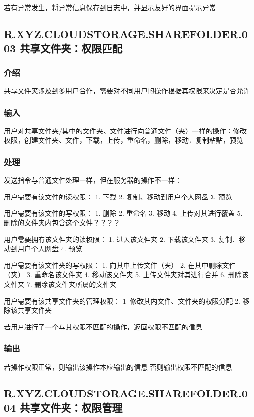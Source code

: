 若有异常发生，将异常信息保存到日志中，并显示友好的界面提示异常


\subsection{R.XYZ.CLOUDSTORAGE.SHAREFOLDER.003 共享文件夹：权限匹配}
 
\subsubsection{介绍}
共享文件夹涉及到多用户合作，需要对不同用户的操作根据其权限来决定是否允许

\subsubsection{输入} 
用户对共享文件夹/其中的文件夹、文件进行向普通文件（夹）一样的操作：修改权限，创建文件夹、文件，下载，上传，重命名，删除，移动，复制粘贴，预览

\subsubsection{处理} 
发送指令与普通文件处理一样，但在服务器的操作不一样：

用户需要有该文件的读权限：
1. 下载
2. 复制、移动到用户个人网盘
3. 预览

用户需要有该文件的写权限：
1. 删除
2. 重命名
3. 移动
4. 上传对其进行覆盖
5. 删除的文件夹内包含这个文件？？？？

用户需要拥有该文件夹的读权限：
1. 进入该文件夹
2. 下载该文件夹
3. 复制、移动到用户个人网盘
4. 预览

用户需要有该文件夹的写权限：
1. 向其中上传文件（夹）
2. 在其中删除文件（夹）
3. 重命名该文件夹
4. 移动该文件夹
5. 上传文件夹对其进行合并
6. 删除该文件夹
7. 删除该文件夹所属的文件夹

用户需要有该共享文件夹的管理权限：
1. 修改其内文件、文件夹的权限分配
2. 移除该共享文件夹

若用户进行了一个与其权限不匹配的操作，返回权限不匹配的信息

\subsubsection{输出} 
若操作权限正常，则输出该操作本应输出的信息
否则输出权限不匹配的信息


\subsection{R.XYZ.CLOUDSTORAGE.SHAREFOLDER.004 共享文件夹：权限管理}

